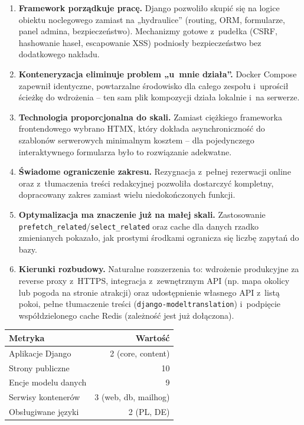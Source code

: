 \documentclass[12pt,a4paper]{article}
\begin{document}
\begin{enumerate}[leftmargin=*]
  \item \textbf{Framework porządkuje pracę.} Django pozwoliło skupić się na logice
    obiektu noclegowego zamiast na „hydraulice” (routing, ORM, formularze, panel
    admina, bezpieczeństwo). Mechanizmy gotowe z~pudełka (CSRF, hashowanie haseł,
    escapowanie XSS) podniosły bezpieczeństwo bez dodatkowego nakładu.

  \item \textbf{Konteneryzacja eliminuje problem „u~mnie działa”.} Docker Compose
    zapewnił identyczne, powtarzalne środowisko dla całego zespołu i~uprościł
    ścieżkę do wdrożenia -- ten sam plik kompozycji działa lokalnie i~na serwerze.

  \item \textbf{Technologia proporcjonalna do skali.} Zamiast ciężkiego frameworka
    frontendowego wybrano HTMX, który dokłada asynchroniczność do szablonów
    serwerowych minimalnym kosztem -- dla pojedynczego interaktywnego formularza
    było to rozwiązanie adekwatne.

  \item \textbf{Świadome ograniczenie zakresu.} Rezygnacja z~pełnej rezerwacji
    online oraz z~tłumaczenia treści redakcyjnej pozwoliła dostarczyć kompletny,
    dopracowany zakres zamiast wielu niedokończonych funkcji.

  \item \textbf{Optymalizacja ma znaczenie już na małej skali.} Zastosowanie
    \texttt{prefetch\_related}/\texttt{select\_related} oraz cache dla danych rzadko
    zmienianych pokazało, jak prostymi środkami ogranicza się liczbę zapytań do bazy.

  \item \textbf{Kierunki rozbudowy.} Naturalne rozszerzenia to: wdrożenie
    produkcyjne za reverse proxy z~HTTPS, integracja z~zewnętrznym API (np. mapa
    okolicy lub pogoda na stronie atrakcji) oraz udostępnienie własnego API z~listą
    pokoi, pełne tłumaczenie treści (\texttt{django-modeltranslation}) i~podpięcie
    współdzielonego cache Redis (zależność jest już dołączona).
\end{enumerate}

\vspace{0.6cm}
\begin{center}
\begin{tabular}{lr}
\toprule
\textbf{Metryka} & \textbf{Wartość} \\
\midrule
Aplikacje Django       & 2 (core, content) \\
Strony publiczne       & 10 \\
Encje modelu danych    & 9 \\
Serwisy kontenerów     & 3 (web, db, mailhog) \\
Obsługiwane języki     & 2 (PL, DE) \\
\bottomrule
\end{tabular}
\end{center}
\end{document}
